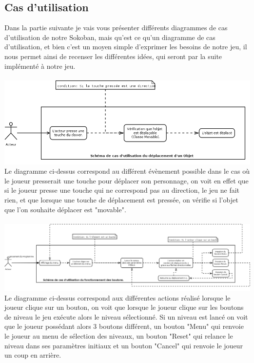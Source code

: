 \documentclass[a4paper,12pt]{article} %
\begin{document}
\subsection{Cas d'utilisation}
Dans la partie suivante je vais vous présenter différents diagrammes de cas d'utilisation de notre Sokoban, mais  qu'est ce qu'un diagramme de cas d'utilisation, et bien c'est un moyen simple d'exprimer les besoins de notre jeu, il nous permet ainsi de recenser les différentes idées, qui seront par la suite implémenté à notre jeu.\\
\\
\includegraphics[scale=0.5]{Diagramme5.png}\\
Le diagramme ci-dessus correspond au différent évènement possible dans le cas où le joueur presserait une touche pour déplacer son personnage, on voit en effet que si le joueur presse une touche qui ne correspond pas au direction, le jeu ne fait rien, et que lorsque une touche de déplacement est pressée, on vérifie si l'objet que l'on souhaite déplacer est "movable".\\
\\
\includegraphics[scale=0.3]{Test.png}\\
Le diagramme ci-dessus correspond aux différentes actions réalisé lorsque le joueur clique sur un bouton, on voit que lorsque le joueur clique sur les boutons de niveau le jeu exécute alors le niveau sélectionné. Si un niveau est lancé on voit que le joueur possédant alors 3 boutons différent, un bouton "Menu" qui renvoie le joueur au menu de sélection des niveaux, un bouton "Reset" qui relance le niveau dans ses paramètres initiaux et un bouton "Cancel" qui renvoie le joueur un coup en arrière.
\end{document}
